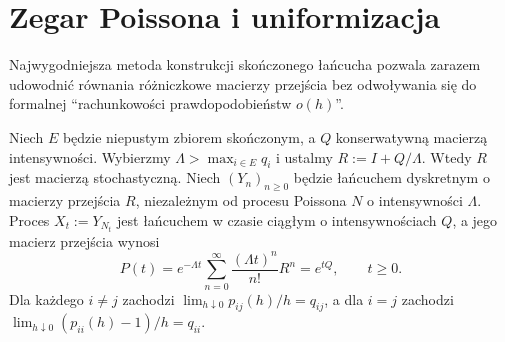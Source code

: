 \section{Zegar Poissona i uniformizacja}
Najwygodniejsza metoda konstrukcji skończonego łańcucha
pozwala zarazem udowodnić równania różniczkowe macierzy
przejścia bez odwoływania się do formalnej ``rachunkowości
prawdopodobieństw $o(h)$''.

\begin{twierdzenie}[Uniformizacja]
\label{thm:uniformization}
Niech $E$ będzie niepustym zbiorem skończonym,
a $Q$ konserwatywną macierzą intensywności.
Wybierzmy $\Lambda>\max_{i\in E}q_i$ i ustalmy
$R:=I+Q/\Lambda$. Wtedy $R$ jest macierzą stochastyczną.
Niech $(Y_n)_{n\ge0}$ będzie łańcuchem dyskretnym o macierzy
przejścia $R$, niezależnym od procesu Poissona $N$ o intensywności
$\Lambda$. Proces $X_t:=Y_{N_t}$ jest łańcuchem w czasie
ciągłym o intensywnościach $Q$, a jego macierz przejścia wynosi
\[
P(t)=e^{-\Lambda t}\sum_{n=0}^\infty
\frac{(\Lambda t)^n}{n!}R^n=e^{tQ},\qquad t\ge0.
\]
Dla każdego $i\ne j$ zachodzi
$\lim_{h\downarrow0}p_{ij}(h)/h=q_{ij}$,
a dla $i=j$ zachodzi
$\lim_{h\downarrow0}(p_{ii}(h)-1)/h=q_{ii}$.
\end{twierdzenie}

